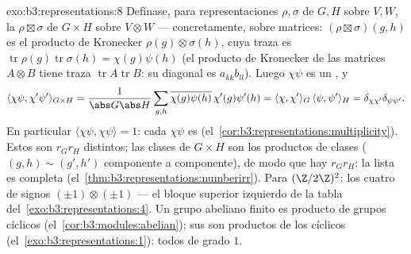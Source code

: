 \begin{solution}{exo:b3:representations:8}
Defínase, para representaciones
$\rho, \sigma$ de $G, H$ sobre $V, W$, la
$\rho \boxtimes \sigma$ de $G \times H$ sobre $V \otimes W$ ---
concretamente, sobre matrices: $(\rho\boxtimes
\sigma)(g,h)$ es el producto de Kronecker $\rho(g)\otimes
\sigma(h)$, cuya traza es
$\operatorname{tr}\rho(g)\operatorname{tr}\sigma(h) =
\chi(g)\psi(h)$ (el producto de Kronecker de las matrices $A \otimes B$
tiene traza $\operatorname{tr}A\operatorname{tr}B$: su diagonal es
$a_{kk}b_{ll}$). Luego $\chi\psi$ es un
, y
\[
\langle\chi\psi, \chi'\psi'\rangle_{G\times H}
= \frac{1}{\abs G\abs H}\sum_{g,h}
\overline{\chi(g)\psi(h)}\,\chi'(g)\psi'(h)
= \langle\chi,\chi'\rangle_G\,\langle\psi,\psi'\rangle_H
= \delta_{\chi\chi'}\delta_{\psi\psi'}.
\]
En particular $\langle\chi\psi,\chi\psi\rangle = 1$: cada $\chi\psi$ es
(el~\cref{cor:b3:representations:multiplicity}). Estos son $r_Gr_H$
 distintos; las clases
de $G\times H$ son los productos de clases ($(g,h) \sim (g',h')$
componente a componente), de modo que hay $r_Gr_H$: la lista es completa
(el~\cref{thm:b3:representations:numberirr}). Para $(\Z/2\Z)^2$: los
cuatro  de signos
$(\pm1)\otimes(\pm1)$ --- el bloque superior izquierdo de la tabla
del~\cref{exo:b3:representations:4}. Un grupo abeliano finito es
producto de grupos cíclicos (el~\cref{cor:b3:modules:abelian}); sus
 son productos de los
cíclicos (el~\cref{exo:b3:representations:1}): todos de grado $1$.
\end{solution}

